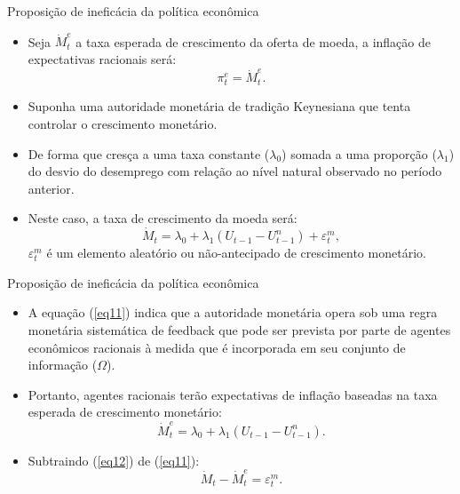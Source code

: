 \documentclass[10pt]{beamer}
\begin{document}
\begin{frame}{Proposição de ineficácia da política econômica}
    \begin{itemize}
        \item Seja $\dot{M}_t^e$ a taxa esperada de crescimento da oferta de moeda, a inflação de expectativas racionais será:
        \begin{equation}
            \pi_t^e = \dot{M}_t^e.
            \label{eq10}
        \end{equation}
        \bigskip
        \item Suponha uma autoridade monetária de tradição Keynesiana que tenta controlar o crescimento monetário.
        \bigskip
        \item De forma que cresça a uma taxa constante ($\lambda_0$) somada a uma proporção ($\lambda_1$) do desvio do desemprego com relação ao nível natural observado no período anterior.
        \bigskip
        \item Neste caso, a taxa de crescimento da moeda será:
        \begin{equation}
            \dot{M}_t = \lambda_0 + \lambda_1 (U_{t-1} - U_{t-1}^n) + \varepsilon_t^m,
            \label{eq11}
        \end{equation}
        $\varepsilon_t^m$ é um elemento aleatório ou não-antecipado de crescimento monetário.
    \end{itemize}
\end{frame}

\begin{frame}{Proposição de ineficácia da política econômica}
    \begin{itemize}
        \item A equação (\ref{eq11}) indica que a autoridade monetária opera sob uma regra monetária sistemática de feedback que pode ser prevista por parte de agentes econômicos racionais à medida que é incorporada em seu conjunto de informação ($\Omega$).
        \bigskip
        \item Portanto, agentes racionais terão expectativas de inflação baseadas na taxa esperada de crescimento monetário:
        \begin{equation}
        \dot{M}_t^e = \lambda_0 + \lambda_1(U_{t-1}-U_{t-1}^n).
        \label{eq12}
        \end{equation}
        \bigskip
        \item Subtraindo (\ref{eq12}) de (\ref{eq11}):
        \begin{equation}
            \dot{M}_t - \dot{M}_t^e = \varepsilon_t^m.
            \label{eq14}
        \end{equation}
    \end{itemize}
\end{frame}
\end{document}
